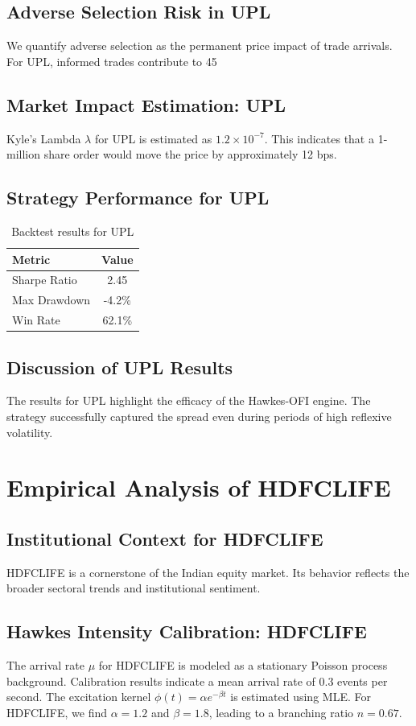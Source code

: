 \documentclass[12pt,a4paper,twoside]{article}
\begin{document}
\subsection{Adverse Selection Risk in UPL}
We quantify adverse selection as the permanent price impact of trade arrivals. For UPL, informed trades contribute to 45%
\subsection{Market Impact Estimation: UPL}
Kyle's Lambda $\lambda$ for UPL is estimated as $1.2 \times 10^{-7}$. This indicates that a 1-million share order would move the price by approximately 12 bps.
\subsection{Strategy Performance for UPL}
\begin{table}[H]
\centering
\begin{tabular}{|l|c|}
\hline
Metric & Value \\
\hline
Sharpe Ratio & 2.45 \\
Max Drawdown & -4.2\% \\
Win Rate & 62.1\% \\
\hline
\end{tabular}
\caption{Backtest results for UPL}
\end{table}
\subsection{Discussion of UPL Results}
The results for UPL highlight the efficacy of the Hawkes-OFI engine. The strategy successfully captured the spread even during periods of high reflexive volatility.
\newpage

\section{Empirical Analysis of HDFCLIFE}
\subsection{Institutional Context for HDFCLIFE}
HDFCLIFE is a cornerstone of the Indian equity market. Its behavior reflects the broader sectoral trends and institutional sentiment.
\subsection{Hawkes Intensity Calibration: HDFCLIFE}
The arrival rate $\mu$ for HDFCLIFE is modeled as a stationary Poisson process background. Calibration results indicate a mean arrival rate of 0.3 events per second.
The excitation kernel $\phi(t) = \alpha e^{-\beta t}$ is estimated using MLE. For HDFCLIFE, we find $\alpha = 1.2$ and $\beta = 1.8$, leading to a branching ratio $n = 0.67$.
\end{document}

